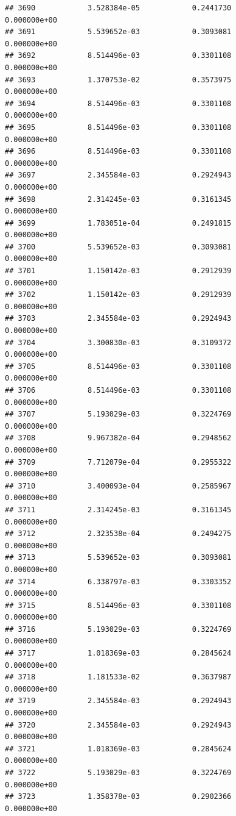 \documentclass[
]{article}
\begin{document}
\begin{verbatim}
## 3690            3.528384e-05            0.2441730            0.000000e+00
## 3691            5.539652e-03            0.3093081            0.000000e+00
## 3692            8.514496e-03            0.3301108            0.000000e+00
## 3693            1.370753e-02            0.3573975            0.000000e+00
## 3694            8.514496e-03            0.3301108            0.000000e+00
## 3695            8.514496e-03            0.3301108            0.000000e+00
## 3696            8.514496e-03            0.3301108            0.000000e+00
## 3697            2.345584e-03            0.2924943            0.000000e+00
## 3698            2.314245e-03            0.3161345            0.000000e+00
## 3699            1.783051e-04            0.2491815            0.000000e+00
## 3700            5.539652e-03            0.3093081            0.000000e+00
## 3701            1.150142e-03            0.2912939            0.000000e+00
## 3702            1.150142e-03            0.2912939            0.000000e+00
## 3703            2.345584e-03            0.2924943            0.000000e+00
## 3704            3.300830e-03            0.3109372            0.000000e+00
## 3705            8.514496e-03            0.3301108            0.000000e+00
## 3706            8.514496e-03            0.3301108            0.000000e+00
## 3707            5.193029e-03            0.3224769            0.000000e+00
## 3708            9.967382e-04            0.2948562            0.000000e+00
## 3709            7.712079e-04            0.2955322            0.000000e+00
## 3710            3.400093e-04            0.2585967            0.000000e+00
## 3711            2.314245e-03            0.3161345            0.000000e+00
## 3712            2.323538e-04            0.2494275            0.000000e+00
## 3713            5.539652e-03            0.3093081            0.000000e+00
## 3714            6.338797e-03            0.3303352            0.000000e+00
## 3715            8.514496e-03            0.3301108            0.000000e+00
## 3716            5.193029e-03            0.3224769            0.000000e+00
## 3717            1.018369e-03            0.2845624            0.000000e+00
## 3718            1.181533e-02            0.3637987            0.000000e+00
## 3719            2.345584e-03            0.2924943            0.000000e+00
## 3720            2.345584e-03            0.2924943            0.000000e+00
## 3721            1.018369e-03            0.2845624            0.000000e+00
## 3722            5.193029e-03            0.3224769            0.000000e+00
## 3723            1.358378e-03            0.2902366            0.000000e+00

\end{verbatim}
\end{document}
